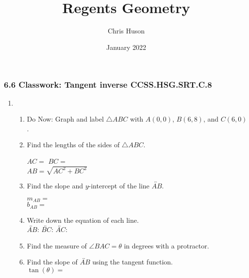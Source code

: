 \documentclass[12pt, twoside]{article}
\title{Regents Geometry}
\author{Chris Huson}
\date{January 2022}
\begin{document}
\subsubsection*{6.6 Classwork: Tangent inverse \hfill CCSS.HSG.SRT.C.8}
\begin{enumerate}
  \item \begin{enumerate}
    \item Do Now: Graph and label $\triangle ABC$ with $A(0,0)$, $B(6,8)$, and $C(6,0)$.
    \begin{center}
    \end{center}
    \item Find the lengths of the sides of $\triangle ABC$.
    \begin{multicols}{2}
      $AC=$ \hspace{3cm}
      $BC=$ \\[1cm]
      $AB=\sqrt{AC^2+BC^2}$
    \end{multicols} \vspace{2.5cm}
    \item Find the slope and $y$-intercept of the line $\overleftrightarrow{AB}$.
      \begin{multicols}{2}
        $m_{AB}=$ \\
        $b_{AB}=$
      \end{multicols} \vspace{0.25cm}
    \item Write down the equation of each line. \\[0.5cm]
      $\overleftrightarrow{AB}$: \hfill
      $\overleftrightarrow{BC}$: \hfill
      $\overleftrightarrow{AC}$: \hspace{2cm}
    \vspace{1cm}
    \item Find the measure of $\angle BAC=\theta$ in degrees with a protractor. \vspace{0.5cm}
    \item Find the slope of $\overleftrightarrow{AB}$ using the tangent function.\\[0.5cm]
    $\displaystyle \tan(\theta)=$
  \end{enumerate}


\end{enumerate}
\end{document}
